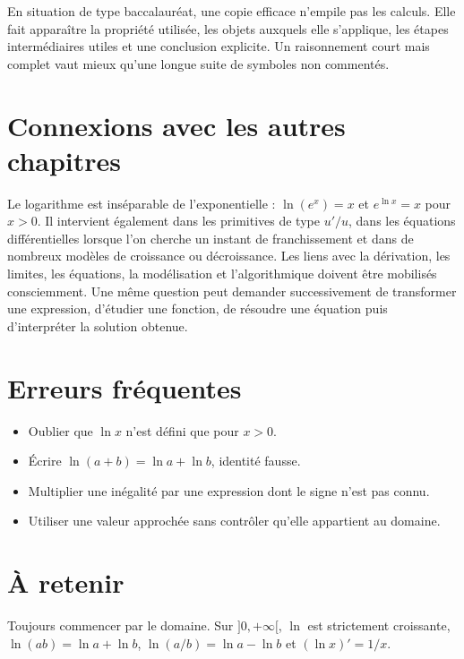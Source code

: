 En situation de type baccalauréat, une copie efficace n’empile pas les calculs. Elle fait apparaître la propriété utilisée, les objets auxquels elle s’applique, les étapes intermédiaires utiles et une conclusion explicite. Un raisonnement court mais complet vaut mieux qu’une longue suite de symboles non commentés.

\section{Connexions avec les autres chapitres}
Le logarithme est inséparable de l’exponentielle : $\ln(e^x)=x$ et $e^{\ln x}=x$ pour $x>0$. Il intervient également dans les primitives de type $u'/u$, dans les équations différentielles lorsque l’on cherche un instant de franchissement et dans de nombreux modèles de croissance ou décroissance.
Les liens avec la dérivation, les limites, les équations, la modélisation et l’algorithmique doivent être mobilisés consciemment. Une même question peut demander successivement de transformer une expression, d’étudier une fonction, de résoudre une équation puis d’interpréter la solution obtenue.

\section{Erreurs fréquentes}
\begin{itemize}
\item Oublier que $\ln x$ n’est défini que pour $x>0$.
\item Écrire $\ln(a+b)=\ln a+\ln b$, identité fausse.
\item Multiplier une inégalité par une expression dont le signe n’est pas connu.
\item Utiliser une valeur approchée sans contrôler qu’elle appartient au domaine.
\end{itemize}

\section{À retenir}
\begin{aretenir}
Toujours commencer par le domaine. Sur $]0,+\infty[$, $\ln$ est strictement croissante, $\ln(ab)=\ln a+\ln b$, $\ln(a/b)=\ln a-\ln b$ et $(\ln x)'=1/x$.
\end{aretenir}
